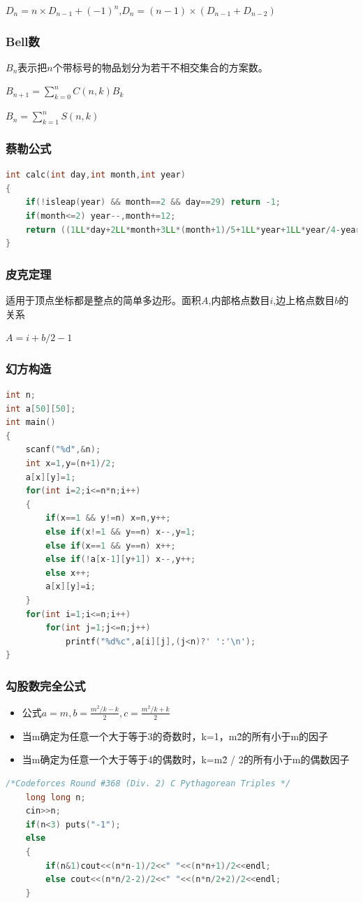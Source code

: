\documentclass[UTF8,a4paper,titlepage]{ctexart}
\begin{document}
$D_n=n\times D_{n-1}+(-1)^n$,$D_n=(n-1)\times(D_{n-1}+D_{n-2})$

\subsubsection*{Bell数}
$B_n$表示把$n$个带标号的物品划分为若干不相交集合的方案数。\par
$B_{n+1}=\sum_{k=0}^nC(n,k)B_k$\par
$B_{n}=\sum_{k=1}^nS(n,k)$\par
\subsubsection*{蔡勒公式}
\begin{lstlisting}[language=C++] 
int calc(int day,int month,int year)
{
    if(!isleap(year) && month==2 && day==29) return -1;
    if(month<=2) year--,month+=12;
    return ((1LL*day+2LL*month+3LL*(month+1)/5+1LL*year+1LL*year/4-year/100+year/400)%7+7)%7;
}  
\end{lstlisting}


\subsubsection*{皮克定理}
适用于顶点坐标都是整点的简单多边形。面积$A$,内部格点数目$i$,边上格点数目$b$的关系 \par
$A=i+b/2-1$

\subsubsection*{幻方构造}
\begin{lstlisting}[language=C++]
int n;
int a[50][50];
int main()
{
    scanf("%d",&n);
    int x=1,y=(n+1)/2;
    a[x][y]=1;
    for(int i=2;i<=n*n;i++)
    {
        if(x==1 && y!=n) x=n,y++;
        else if(x!=1 && y==n) x--,y=1;
        else if(x==1 && y==n) x++;
        else if(!a[x-1][y+1]) x--,y++;
        else x++;
        a[x][y]=i;
    }
    for(int i=1;i<=n;i++)
        for(int j=1;j<=n;j++)
            printf("%d%c",a[i][j],(j<n)?' ':'\n');
}
        \end{lstlisting}
\subsubsection*{勾股数完全公式}
\begin{itemize}
	\item 公式$a=m,b=\frac{m^2/k-k}{2},c=\frac{m^2/k+k}{2}$
	\item 当m确定为任意一个大于等于3的奇数时，k={1，m\^2的所有小于m的因子}
	\item 当m确定为任意一个大于等于4的偶数时，k={m\^2 / 2的所有小于m的偶数因子}
\end{itemize}
\begin{lstlisting}[language=C++]   
/*Codeforces Round #368 (Div. 2) C Pythagorean Triples */
    long long n;
    cin>>n;
    if(n<3) puts("-1");
    else
    {
        if(n&1)cout<<(n*n-1)/2<<" "<<(n*n+1)/2<<endl;
        else cout<<(n*n/2-2)/2<<" "<<(n*n/2+2)/2<<endl;
    }
        \end{lstlisting}
\end{document}
